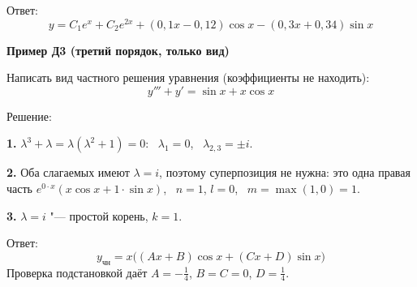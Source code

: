 \documentclass[11pt,a4paper]{article}
\newcommand{\example}[1]{\par\medskip\noindent\textbf{#1}\par\nopagebreak\smallskip}
\newcommand{\ych}{y_{\text{чн}}}
\begin{document}
Ответ:
\[
  y = C_1 e^{x} + C_2 e^{2x} + (0{,}1x - 0{,}12)\cos x - (0{,}3x + 0{,}34)\sin x
\]

\example{Пример Д3 (третий порядок, только вид)}

Написать вид частного решения уравнения (коэффициенты не находить):
\[
  y''' + y' = \sin x + x\cos x
\]

Решение:

\textbf{1.} $\lambda^3 + \lambda = \lambda(\lambda^2 + 1) = 0$: \ $\lambda_1 = 0$, \ $\lambda_{2,3} = \pm i$.

\textbf{2.} Оба слагаемых имеют $\lambda = i$, поэтому суперпозиция не нужна: это одна правая часть $e^{0 \cdot x}(x\cos x + 1 \cdot \sin x)$, \ $n = 1$, $l = 0$, \ $m = \max(1, 0) = 1$.

\textbf{3.} $\lambda = i$ "--- простой корень, $k = 1$.

Ответ:
\[
  \ych = x\bigl((Ax + B)\cos x + (Cx + D)\sin x\bigr)
\]
Проверка подстановкой даёт $A = -\frac14$, $B = C = 0$, $D = \frac14$.
\end{document}
